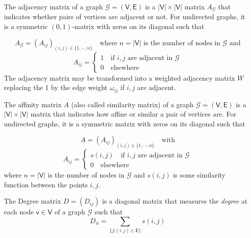 \begin{definition}
	The adjacency matrix of a graph $\mathcal{G}=(\mathsf{V}, \mathsf{E})$ is a $|\mathsf{V}| \times |\mathsf{V}|$ matrix $A_{\mathcal{G}}$ that indicates whether pairs of vertices are adjacent or not. For undirected graphs, it is a symmetric $(0,1)$-matrix with zeros on its diagonal such that 
	
	\begin{equation}	
		A_{\mathcal{G}} = (A_{ij})_{(i, j)\in \{1,\cdots, n\}}  \quad \text{where $n=|\mathsf{V}|$ is the number of nodes in $\mathcal{G}$ and} \nonumber 		
	\end{equation}
	\begin{equation}	
		A_{ij}= 
		\begin{cases}
			1 \quad \text{if $i, j$ are adjacent in $\mathcal{G}$} \\
			0 \quad \text{elsewhere}
		\end{cases}		\nonumber		
	\end{equation}
	The adjacency matrix may be transformed into a weighted adjacency matrix $W$ replacing the 1 by the edge weight $\omega_{ij}$ if $i, j$ are adjacent.
\end{definition}

\begin{definition}
	The affinity matrix $A$ (also called similarity matrix) of a graph $\mathcal{G}=(\mathsf{V}, \mathsf{E})$ is a $|\mathsf{V}| \times |\mathsf{V}|$ matrix that indicates how affine or similar a pair of vertices are. For undirected graphs, it is a symmetric matrix with zeros on its diagonal such that 
	
	\begin{equation}	
		A = (A_{ij})_{(i, j)\in \{1,\cdots, n\}}  \quad \text{with}  \nonumber 		
	\end{equation}
	\begin{equation}	
		A_{ij}= 
		\begin{cases}
			s(i,j) \quad \text{if $i, j$ are adjacent in $\mathcal{G}$} \\
			0 \quad \text{elsewhere}
		\end{cases}	 \nonumber		
	\end{equation}
where $n=|\mathsf{V}|$ is the number of nodes in $\mathcal{G}$ and $s(i,j)$ is some similarity function between the points $i,j$.
\end{definition}

\begin{definition}
	The Degree matrix $D=(D_{ij})$ is a diagonal matrix that measures the \textit{degree} at each node $\mathsf{v} \in \mathsf{V}$ of a graph $\mathcal{G}$ such that 
	\begin{equation}	
		D_{ii} =  \underset{\{j|(i,j)\in \mathsf{E}\}}{\sum}  s(i,j)  \nonumber 		
	\end{equation}	
\end{definition}

